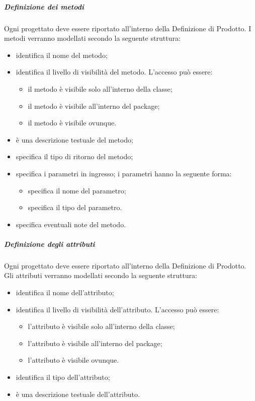 \subparagraph{Definizione dei metodi}
Ogni  progettato deve essere riportato all'interno della Definizione di Prodotto. I metodi verranno modellati secondo la seguente struttura:
\begin{itemize}
\item {}identifica il nome del metodo;
\item {}identifica il livello di visibilità del metodo. L'accesso può essere:
\begin{itemize}
\item {}il metodo è visibile solo all'interno della classe;
\item {}il metodo è visibile all'interno del package;
\item {}il metodo è visibile ovunque.
\end{itemize}
\item {}è una descrizione testuale del metodo;
\item {}specifica il tipo di ritorno del metodo;
\item {}specifica i parametri in ingresso; i parametri hanno la seguente forma:
\begin{itemize}
\item {}specifica il nome del parametro;
\item {}specifica il tipo del parametro.
\end{itemize}
\item {}specifica eventuali note del metodo.
\end{itemize}


\subparagraph{Definizione degli attributi}
Ogni  progettato deve essere riportato all'interno della Definizione di Prodotto. Gli attributi verranno modellati secondo la seguente struttura:
\begin{itemize}
\item {}identifica il nome dell'attributo;
\item {}identifica il livello di visibilità dell'attributo. L'accesso può essere:
\begin{itemize}
\item {}l'attributo è visibile solo all'interno della classe;
\item {}l'attributo è visibile all'interno del package;
\item {}l'attributo è visibile ovunque.
\end{itemize}
\item {}identifica il tipo dell'attributo;
\item {}è una descrizione testuale dell'attributo.
\end{itemize}


